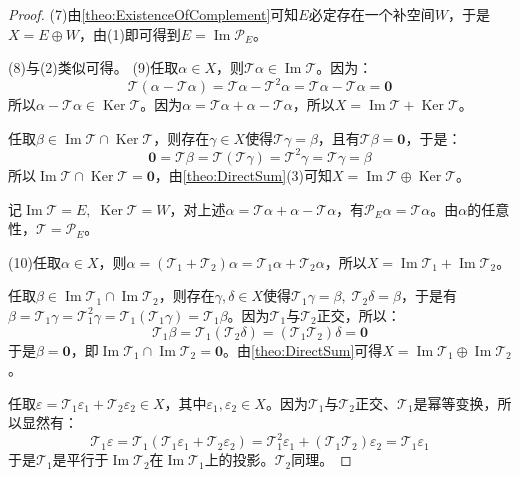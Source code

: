 \begin{proof}
	(7)由\cref{theo:ExistenceOfComplement}可知$E$必定存在一个补空间$W$，于是$X=E\oplus W$，由(1)即可得到$E=\operatorname{Im}\mathcal{P}_E$。\par
	(8)与(2)类似可得。
	(9)任取$\alpha\in X$，则$\mathcal{T}\alpha\in\operatorname{Im}\mathcal{T}$。因为：
	\begin{equation*}
		\mathcal{T}(\alpha-\mathcal{T}\alpha)=\mathcal{T}\alpha-\mathcal{T}^2\alpha=\mathcal{T}\alpha-\mathcal{T}\alpha=\mathbf{0}
	\end{equation*}
	所以$\alpha-\mathcal{T}\alpha\in\operatorname{Ker}\mathcal{T}$。因为$\alpha=\mathcal{T}\alpha+\alpha-\mathcal{T}\alpha$，所以$X=\operatorname{Im}\mathcal{T}+\operatorname{Ker}\mathcal{T}$。\par
	任取$\beta\in\operatorname{Im}\mathcal{T}\cap\operatorname{Ker}\mathcal{T}$，则存在$\gamma\in X$使得$\mathcal{T}\gamma=\beta$，且有$\mathcal{T}\beta=\mathbf{0}$，于是：
	\begin{equation*}
		\mathbf{0}=\mathcal{T}\beta=\mathcal{T}(\mathcal{T}\gamma)=\mathcal{T}^2\gamma=\mathcal{T}\gamma=\beta
	\end{equation*}
	所以$\operatorname{Im}\mathcal{T}\cap\operatorname{Ker}\mathcal{T}=\mathbf{0}$，由\cref{theo:DirectSum}(3)可知$X=\operatorname{Im}\mathcal{T}\oplus\operatorname{Ker}\mathcal{T}$。\par
	记$\operatorname{Im}\mathcal{T}=E,\;\operatorname{Ker}\mathcal{T}=W$，对上述$\alpha=\mathcal{T}\alpha+\alpha-\mathcal{T}\alpha$，有$\mathcal{P}_E\alpha=\mathcal{T}\alpha$。由$\alpha$的任意性，$\mathcal{T}=\mathcal{P}_E$。\par
	(10)任取$\alpha\in X$，则$\alpha=(\mathcal{T}_1+\mathcal{T}_2)\alpha=\mathcal{T}_1\alpha+\mathcal{T}_2\alpha$，所以$X=\operatorname{Im}\mathcal{T}_1+\operatorname{Im}\mathcal{T}_2$。\par
	任取$\beta\in\operatorname{Im}\mathcal{T}_1\cap\operatorname{Im}\mathcal{T}_2$，则存在$\gamma,\delta\in X$使得$\mathcal{T}_1\gamma=\beta,\;\mathcal{T}_2\delta=\beta$，于是有$\beta=\mathcal{T}_1\gamma=\mathcal{T}_1^2\gamma=\mathcal{T}_1(\mathcal{T}_1\gamma)=\mathcal{T}_1\beta$。因为$\mathcal{T}_1$与$\mathcal{T}_2$正交，所以：
	\begin{equation*}
		\mathcal{T}_1\beta=\mathcal{T}_1(\mathcal{T}_2\delta)=(\mathcal{T}_1\mathcal{T}_2)\delta=\mathbf{0}
	\end{equation*}
	于是$\beta=\mathbf{0}$，即$\operatorname{Im}\mathcal{T}_1\cap\operatorname{Im}\mathcal{T}_2=\mathbf{0}$。由\cref{theo:DirectSum}可得$X=\operatorname{Im}\mathcal{T}_1\oplus\operatorname{Im}\mathcal{T}_2$。\par
	任取$\varepsilon=\mathcal{T}_1\varepsilon_1+\mathcal{T}_2\varepsilon_2\in X$，其中$\varepsilon_1,\varepsilon_2\in X$。因为$\mathcal{T}_1$与$\mathcal{T}_2$正交、$\mathcal{T}_1$是幂等变换，所以显然有：
	\begin{equation*}
		\mathcal{T}_1\varepsilon=\mathcal{T}_1(\mathcal{T}_1\varepsilon_1+\mathcal{T}_2\varepsilon_2)=\mathcal{T}_1^2\varepsilon_1+(\mathcal{T}_1\mathcal{T}_2)\varepsilon_2=\mathcal{T}_1\varepsilon_1
	\end{equation*}
	于是$\mathcal{T}_1$是平行于$\operatorname{Im}\mathcal{T}_2$在$\operatorname{Im}\mathcal{T}_1$上的投影。$\mathcal{T}_2$同理。
\end{proof}